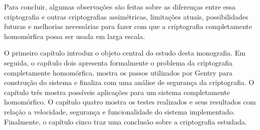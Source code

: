 Para concluir, algumas observações são feitas sobre as diferenças entre essa criptografia e outras criptografias assimétricas, limitações atuais, possibilidades futuras e melhorias necessárias para fazer com que a criptografia completamente homomórfica possa ser usada em larga escala.

O primeiro capítulo introduz o objeto central do estudo desta monografia. Em seguida, o capítulo dois apresenta formalmente o problema da criptografia completamente homomórfica, mostra os passos utilizados por Gentry para construção do sistema e finaliza com uma análise de segurança da criptografia. O capítulo três mostra possíveis aplicações para um sistema completamente homomórfico. O capítulo quatro mostra os testes realizados e seus resultados com relação a velocidade, segurança e funcionalidade do sistema implementado. Finalmente, o capítulo cinco traz uma conclusão sobre a criptografia estudada.